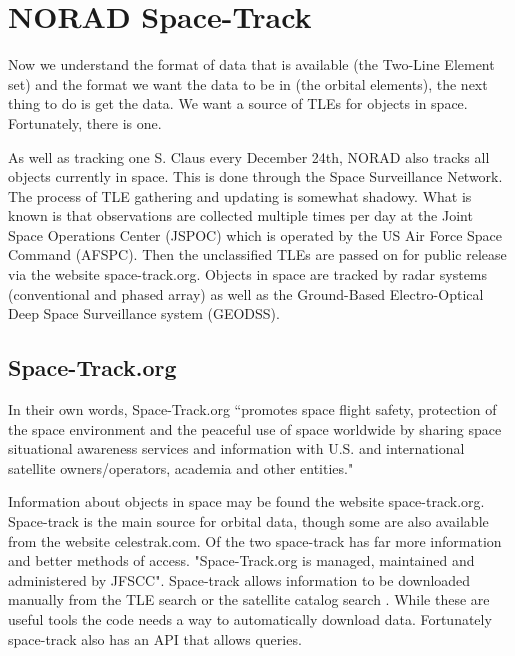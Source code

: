 \documentclass[12pt]{article}
\begin{document}
	\section{NORAD Space-Track}	
	Now we understand the format of data that is available (the Two-Line Element set) and the format we want the data to be in (the orbital elements), the next thing to do is get the data. We want a source of TLEs for objects in space. Fortunately, there is one.\par 
	As well as tracking one S. Claus every December 24th\cite{noradSC},  NORAD also tracks all objects currently in space. This is done through the Space Surveillance Network\cite{ssncltrak}. The process of TLE gathering and updating is somewhat shadowy. \cite{vallado2012two} What is known is that observations are collected multiple times per day at the Joint Space Operations Center (JSPOC) which is operated by the US Air Force Space Command (AFSPC). Then the unclassified TLEs are passed on for public release via the website space-track.org. Objects in space are tracked by radar systems (conventional and phased array) as well as the Ground-Based Electro-Optical Deep Space Surveillance system (GEODSS)\cite{GEODSS}.
	

	
	
	\subsection{Space-Track.org}
	In their own words, Space-Track.org  ``promotes space flight safety, protection of the space environment and the peaceful use of space worldwide by sharing space situational awareness services and information with U.S. and international satellite owners/operators, academia and other entities."\cite{SpaceTrackHome}\par 
	Information about objects in space may be found the website space-track.org. Space-track is the main source for orbital data, though some are also available from the website celestrak.com. Of the two space-track has far more information and better methods of access.  "Space-Track.org is managed, maintained and administered by JFSCC"\cite{SpaceTrackLegend}.   %
	Space-track allows information to be downloaded manually from the TLE search \cite{SpaceTrackTLE} or the satellite catalog search \cite{SpaceTrackSATCAT}. While these are useful tools the code needs a way to automatically download data. Fortunately space-track also has an API that allows queries. 
\end{document}

